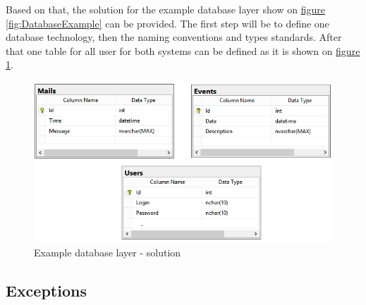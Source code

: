 \newpage
Based on that, the solution for the example database layer show on \hyperref[fig:DatabaseExample]{figure \ref{fig:DatabaseExample}} can be provided.
The first step will be to define one database technology, then the naming conventions and types standards. After that one table for all user for both systems can be defined as it is shown on \hyperref[fig:DatabaseExample]{figure \ref{fig:DatabaseExampleSolution}}.

\begin{figure}[!h]
    \centering
    \includegraphics[width=\textwidth]{Images/sesolution.png}
    \caption[Example database layer - solution]{Example database layer - solution}
    \label{fig:DatabaseExampleSolution}
\end{figure}


\subsection{Exceptions}


